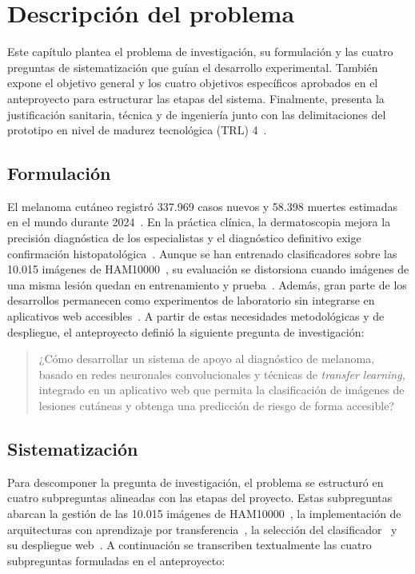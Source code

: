 \chapter{Descripción del problema}

Este capítulo plantea el problema de investigación, su formulación y las cuatro preguntas de sistematización que guían el desarrollo experimental. También expone el objetivo general y los cuatro objetivos específicos aprobados en el anteproyecto para estructurar las etapas del sistema. Finalmente, presenta la justificación sanitaria, técnica y de ingeniería junto con las delimitaciones del prototipo en nivel de madurez tecnológica (TRL) 4~\cite{amaral2025esmo,vasey2022decideai}.

\section{Formulación}

El melanoma cutáneo registró 337.969 casos nuevos y 58.398 muertes estimadas en el mundo durante 2024~\cite{sung2026globocan,iarc2026melanoma}. En la práctica clínica, la dermatoscopia mejora la precisión diagnóstica de los especialistas y el diagnóstico definitivo exige confirmación histopatológica~\cite{amaral2025esmo}. Aunque se han entrenado clasificadores sobre las 10.015 imágenes de HAM10000~\cite{tschandl2018ham10000}, su evaluación se distorsiona cuando imágenes de una misma lesión quedan en entrenamiento y prueba~\cite{kapoor2023leakage,abhishek2025quality}. Además, gran parte de los desarrollos permanecen como experimentos de laboratorio sin integrarse en aplicativos web accesibles~\cite{farias2026}. A partir de estas necesidades metodológicas y de despliegue, el anteproyecto definió la siguiente pregunta de investigación:

\begin{quote}
¿Cómo desarrollar un sistema de apoyo al diagnóstico de melanoma, basado en redes neuronales convolucionales y técnicas de \textit{transfer learning}, integrado en un aplicativo web que permita la clasificación de imágenes de lesiones cutáneas y obtenga una predicción de riesgo de forma accesible?
\end{quote}

\section{Sistematización}

Para descomponer la pregunta de investigación, el problema se estructuró en cuatro subpreguntas alineadas con las etapas del proyecto. Estas subpreguntas abarcan la gestión de las 10.015 imágenes de HAM10000~\cite{tschandl2018ham10000}, la implementación de arquitecturas con aprendizaje por transferencia~\cite{zhang2024dive}, la selección del clasificador~\cite{maierhein2024metrics} y su despliegue web~\cite{ning2024onnxweb}. A continuación se transcriben textualmente las cuatro subpreguntas formuladas en el anteproyecto:

